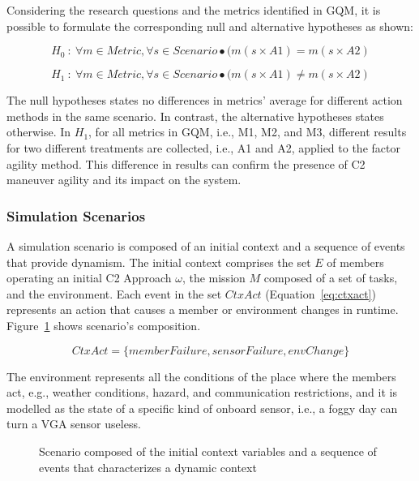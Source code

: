 Considering the research questions and the metrics identified in GQM, it is possible to formulate the corresponding null and alternative hypotheses as shown:

$$H_0\: : \:\forall m \in Metric, \forall s \in Scenario \bullet (m(s \times A1)=m(s \times A2)$$

$$H_1\: : \:\forall m \in Metric, \forall s \in Scenario \bullet (m(s \times A1) \neq m(s \times A2)$$

The null hypotheses states no differences in metrics' average for different action methods in the same scenario. In contrast, the alternative hypotheses states otherwise. In $H_1$, for all metrics in GQM, i.e., M1, M2, and M3, different results for two different treatments are collected, i.e., A1 and A2, applied to the factor agility method. This difference in results can confirm the presence of C2 maneuver agility and its impact on the system.

\subsubsection{Simulation Scenarios}
\label{sssec:scenarios}

A simulation scenario is composed of an initial context and a sequence of events that provide dynamism. The initial context comprises the set $E$ of members operating an initial C2 Approach $\omega$, the mission $M$ composed of a set of tasks, and the environment. Each event in the set $CtxAct$ (Equation~\ref{eq:ctxact}) represents an action that causes a member or environment changes in runtime. Figure~\ref{fig:scenario} shows scenario's composition.

\begin{equation}
    \label{eq:ctxact}
    CtxAct = \{memberFailure,sensorFailure, envChange \} 
\end{equation}

The environment represents all the conditions of the place where the members act, e.g., weather conditions, hazard, and communication restrictions, and it is modelled as the state of a specific kind of onboard sensor, i.e., a foggy day can turn a VGA sensor useless.

\begin{figure}[ht!]
    \centering
    \scalebox{.6}{}
    \caption{Scenario composed of the initial context variables and a sequence of events that characterizes a dynamic context}
    \label{fig:scenario}
\end{figure}

